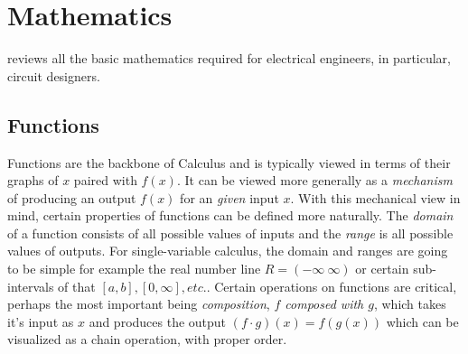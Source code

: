 \cleardoublepage
\chapter{Mathematics}
\label{ch:math}

 reviews all the basic mathematics required for electrical engineers, in particular, circuit designers. 

\section{Functions}
\begin{marginfigure}[-5\baselineskip]
\end{marginfigure}
Functions are the backbone of Calculus and is typically viewed in terms of their graphs of $x$ paired with $f(x)$. It can be viewed more generally as a {\it mechanism} of producing an output $f(x)$ for an {\it given} input $x$. With this mechanical view in mind, certain properties of functions can be defined more naturally. The {\it domain} of a function consists of all possible values of inputs and the {\it range} is all possible values of outputs. For single-variable calculus, the domain and ranges are going to be simple for example the real number line $R=(-\infty ~\infty)$ or certain sub-intervals of that $[a,b], [0, \infty], etc.$. 
Certain operations on functions are critical, perhaps the most important being \textit{composition}, \textit{$f$ composed with $g$}, which takes it's input as $x$ and produces the output $(f\cdot g)(x)=f(g(x))$ which can be visualized as a chain operation, with proper order.

